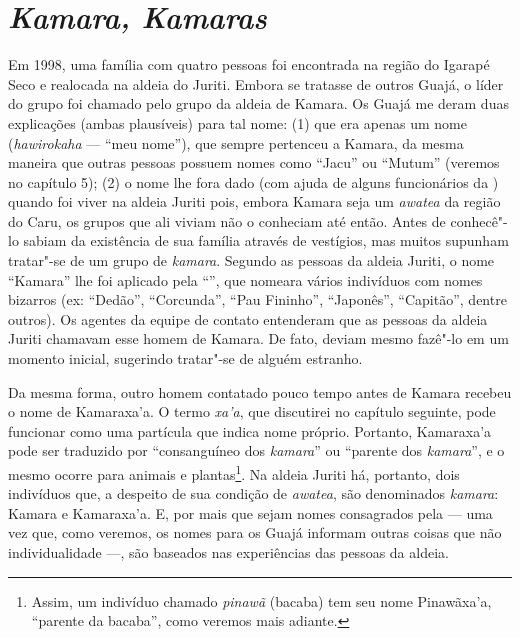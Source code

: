 \section{\emph{Kamara, Kamaras}}

Em 1998, uma família com quatro pessoas foi encontrada na região do
Igarapé Seco e realocada na aldeia do  Juriti. Embora se tratasse de
outros Guajá, o líder do grupo foi chamado pelo grupo da aldeia de
Kamara. Os Guajá me deram duas explicações (ambas plausíveis) para tal
nome: (1) que era apenas um nome (\emph{hawirokaha} --- ``meu nome''), que
sempre pertenceu a Kamara, da mesma maneira que outras pessoas possuem
nomes como ``Jacu'' ou ``Mutum'' (veremos no capítulo 5); (2) o nome lhe
fora dado (com ajuda de alguns funcionários da ) quando foi viver
na aldeia Juriti pois, embora Kamara seja um \emph{awatea} da região do
Caru, os grupos que ali viviam não o conheciam até então. Antes de
conhecê"-lo sabiam da existência de sua família através de vestígios, mas
muitos supunham tratar"-se de um grupo de \emph{kamara}. Segundo as
pessoas da aldeia Juriti, o nome ``Kamara'' lhe foi aplicado pela ``'',
que nomeara vários indivíduos com nomes bizarros (ex: ``Dedão'',
``Corcunda'', ``Pau Fininho'', ``Japonês'', ``Capitão'', dentre outros). Os
agentes da equipe de contato entenderam que as pessoas da aldeia Juriti
chamavam esse homem de Kamara. De fato, deviam mesmo fazê"-lo em um
momento inicial, sugerindo tratar"-se de alguém estranho.

Da mesma forma, outro homem contatado pouco tempo antes de Kamara
recebeu o nome de Kamaraxa'a. O termo \emph{xa'a}, que discutirei no
capítulo seguinte, pode funcionar como uma partícula que indica nome
próprio. Portanto, Kamaraxa'a pode ser traduzido por ``consanguíneo dos
\emph{kamara}'' ou ``parente dos \emph{kamara}'', e o mesmo ocorre para
animais e plantas\footnote{Assim, um indivíduo chamado \emph{pinawã}
  (bacaba) tem seu nome Pinawãxa'a, ``parente da bacaba'', como veremos
  mais adiante.}. Na aldeia Juriti há, portanto, dois indivíduos que, a
despeito de sua condição de \emph{awatea}, são denominados
\emph{kamara}: Kamara e Kamaraxa'a. E, por mais que sejam nomes
consagrados pela  --- uma vez que, como veremos, os nomes para os
Guajá informam outras coisas que não individualidade ---, são baseados nas
experiências das pessoas da aldeia.

